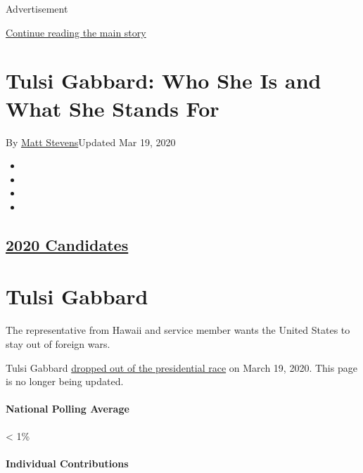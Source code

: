 Advertisement

\protect\hyperlink{after-top}{Continue reading the main story}

\hypertarget{tulsi-gabbard-who-she-is-and-what-she-stands-for}{%
\section{Tulsi Gabbard: Who She Is and What She Stands
For}\label{tulsi-gabbard-who-she-is-and-what-she-stands-for}}

By \href{https://www.nytimes.com/by/matt-stevens}{Matt Stevens}Updated
Mar 19, 2020

\begin{itemize}
\item
\item
\item
\item
\end{itemize}

\hypertarget{2020-candidates}{%
\subsection{\texorpdfstring{\href{https://www.nytimes.com/interactive/2019/us/politics/2020-presidential-candidates.html}{2020
Candidates}}{2020 Candidates}}\label{2020-candidates}}

\hypertarget{tulsi-gabbard}{%
\section{Tulsi Gabbard}\label{tulsi-gabbard}}

The representative from Hawaii and service member wants the United
States to stay out of foreign wars.

Tulsi Gabbard
\href{https://www.nytimes.com/2020/03/19/us/politics/tulsi-gabbard-drops-out.html}{dropped
out of the presidential race} on March 19, 2020. This page is no longer
being updated.

\hypertarget{national-polling-average}{%
\paragraph{National Polling Average}\label{national-polling-average}}

\textless{} 1\%

\hypertarget{individual-contributions}{%
\paragraph{Individual Contributions}\label{individual-contributions}}

